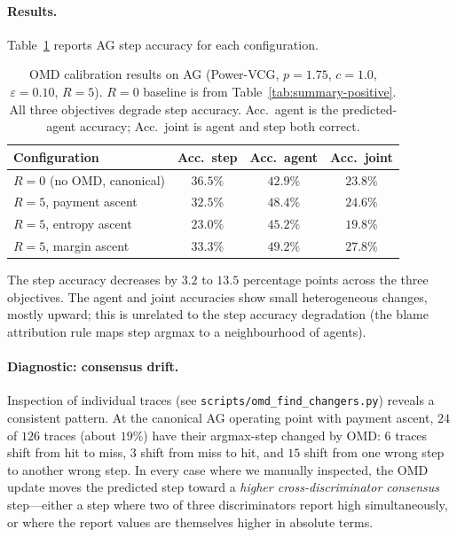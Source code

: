 \documentclass[11pt]{article}
\begin{document}
\paragraph{Results.}
Table~\ref{tab:omd-objectives} reports AG step accuracy for each
configuration.

\begin{table}[h]
\centering
\small
\caption{OMD calibration results on AG (Power-VCG, $p = 1.75$, $c = 1.0$,
$\varepsilon = 0.10$, $R = 5$). $R = 0$ baseline is from
Table~\ref{tab:summary-positive}. All three objectives degrade step
accuracy. Acc.\ agent is the predicted-agent accuracy; Acc.\ joint is
agent and step both correct.}
\label{tab:omd-objectives}
\begin{tabular}{lccc}
\toprule
Configuration & Acc.\ step & Acc.\ agent & Acc.\ joint \\
\midrule
$R = 0$ (no OMD, canonical)        & $\mathbf{36.5\%}$ & $42.9\%$ & $23.8\%$ \\
\midrule
$R = 5$, payment ascent             & $32.5\%$ & $48.4\%$ & $24.6\%$ \\
$R = 5$, entropy ascent             & $23.0\%$ & $45.2\%$ & $19.8\%$ \\
$R = 5$, margin ascent              & $33.3\%$ & $49.2\%$ & $27.8\%$ \\
\bottomrule
\end{tabular}
\end{table}

The step accuracy decreases by $3.2$ to $13.5$ percentage points across
the three objectives. The agent and joint accuracies show small
heterogeneous changes, mostly upward; this is unrelated to the step
accuracy degradation (the blame attribution rule maps step argmax to a
neighbourhood of agents).

\paragraph{Diagnostic: consensus drift.}
\begin{sloppypar}
Inspection of individual traces (see
\texttt{scripts/omd\_find\_changers.py}) reveals a consistent pattern. At
the canonical AG operating point with payment ascent, $24$ of $126$ traces
(about $19\%$) have their argmax-step changed by OMD: $6$ traces shift from
hit to miss, $3$ shift from miss to hit, and $15$ shift from one wrong step
to another wrong step. In every case where we manually inspected, the OMD
update moves the predicted step toward a \emph{higher cross-discriminator
consensus} step---either a step where two of three discriminators report
high simultaneously, or where the report values are themselves higher in
absolute terms.
\end{sloppypar}
\end{document}
